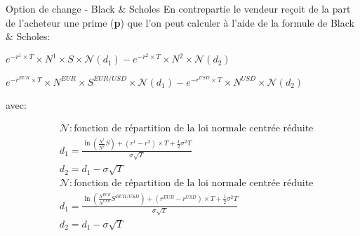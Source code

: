 \documentclass{beamer}
\begin{document}
\begin{frame}{Option de change - Black \& Scholes }
En contrepartie le vendeur reçoit de la part de l'acheteur une prime (\textbf{p})  que l'on peut calculer à l'aide de la formule de Black \& Scholes:\\
\vspace{0.5cm}
\begin{overprint}
\begin{center}
$e^{-r^1 \times T} \times N^1 \times S \times \mathcal{N}(d_1)-e^{-r^2 \times T} \times N^2 \times \mathcal{N}(d_2)$
\end{center}
\begin{center}
$e^{-r^{EUR} \times T} \times N^{EUR} \times S^{EUR/USD} \times \mathcal{N}(d_1)-e^{-r^{USD} \times T} \times N^{USD} \times \mathcal{N}(d_2)$
\end{center}
\end{overprint}
avec:\\
\begin{overprint}
\[
\begin{split}
&\mathcal{N} : \text{fonction de répartition de la loi normale centrée réduite}\\
&d_1=\frac{\ln\left( \frac{N^1}{N^2} S \right)+(r^1-r^2) \times T+\frac{1}{2}\sigma^2 T}{\sigma\sqrt{T}}\\
&d_2=d_1-\sigma\sqrt{T}
\end{split}
\]
\[
\begin{split}
&\mathcal{N} : \text{fonction de répartition de la loi normale centrée réduite}\\
&d_1=\frac{\ln\left( \frac{N^{EUR}}{N^{USD}} S^{EUR/USD} \right)+(r^{EUR}-r^{USD}) \times T+\frac{1}{2}\sigma^2 T}{\sigma\sqrt{T}}\\
&d_2=d_1-\sigma\sqrt{T}
\end{split}
\]
\end{overprint}
\end{frame}
\end{document}
